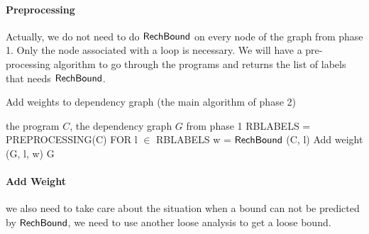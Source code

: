 \paragraph{Preprocessing} Actually, we do not need to do $\mathsf{RechBound}$ on every node of the graph from phase 1. Only the node associated with a loop is necessary. We will have a pre-processing algorithm to go through the programs and returns the list of labels that needs {$\mathsf{RechBound}$}. 

\begin{algorithm}
\caption{
{Add weights to dependency graph (the main algorithm of phase 2)}
\label{alg:preproce_rb}
}
\begin{algorithmic}
\REQUIRE the program $C$, the dependency graph $G$ from phase 1
\STATE  RBLABELS = PREPROCESSING(C) 
\STATE FOR l $\in$ RBLABELS
\STATE w = $\mathsf{RechBound}$ (C, l)
\STATE Add weight (G, l, w)
\RETURN G
\end{algorithmic}
\end{algorithm}

\paragraph{Add Weight} we also need to take care about the situation when a bound can not be predicted by {$\mathsf{RechBound}$}, we need to use another loose analysis to get a loose bound.

\clearpage
